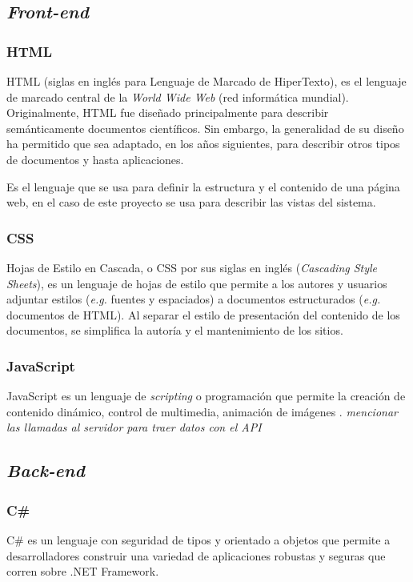 \subsection{\emph{Front-end}}
\subsubsection{HTML}
HTML (siglas en inglés para Lenguaje de Marcado de HiperTexto), es el lenguaje de marcado central de la \textit{World Wide Web} (red informática mundial). Originalmente, HTML fue diseñado principalmente para describir semánticamente documentos científicos. Sin embargo, la generalidad de su diseño ha permitido que sea adaptado, en los años siguientes, para describir otros tipos de documentos y hasta aplicaciones. \cite{htmlW3C}

Es el lenguaje que se usa para definir la estructura y el contenido de una página web, en el caso de este proyecto se usa para describir las vistas del sistema.

\subsubsection{CSS}
Hojas de Estilo en Cascada, o CSS por sus siglas en inglés (\textit{Cascading Style Sheets}), es un lenguaje de hojas de estilo que permite a los autores y usuarios adjuntar estilos (\textit{e.g.} fuentes y espaciados) a documentos estructurados (\textit{e.g.} documentos de HTML). Al separar el estilo de presentación del contenido de los documentos, se simplifica la autoría y el mantenimiento de los sitios. \cite{cssW3C}

\subsubsection{JavaScript}
JavaScript es un lenguaje de \textit{scripting} o programación que permite la creación de contenido dinámico, control de multimedia, animación de imágenes \cite{jsMozilla}. \emph{mencionar las llamadas al servidor para traer datos con el API}


\subsection{\emph{Back-end}}
\subsubsection{C\#}
C\# es un lenguaje con seguridad de tipos y orientado a objetos que permite a desarrolladores construir una variedad de aplicaciones robustas y seguras que corren sobre .NET Framework. \cite{cSharpMicrosoft}

